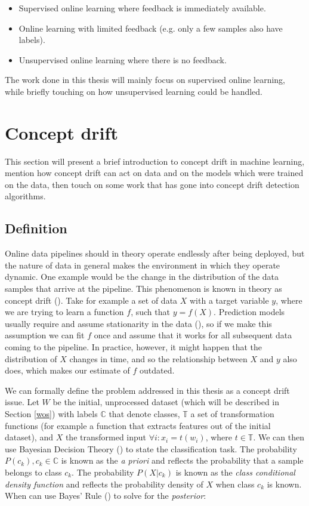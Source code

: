 \documentclass[12pt]{extreport}
\begin{document}
\begin{itemize}
    \item Supervised online learning where feedback is immediately available.
    \item Online learning with limited feedback (e.g. only a few samples also have labels).
    \item Unsupervised online learning where there is no feedback.
\end{itemize}

The work done in this thesis will mainly focus on supervised online learning, while briefly touching on how unsupervised learning could be handled.

\section{Concept drift} \label{concept-drift}

This section will present a brief introduction to concept drift in machine learning, mention how concept drift can act on data and on the models which were trained on the data, then touch on some work that has gone into concept drift detection algorithms.

\subsection{Definition}

Online data pipelines should in theory operate endlessly after being deployed, but the nature of data in general makes the environment in which they operate dynamic. One example would be the change in the distribution of the data samples that arrive at the pipeline. This phenomenon is known in theory as concept drift (\cite{survey-concept-drift}). Take for example a set of data $X$ with a target variable $y$, where we are trying to learn a function $f$, such that $y = f(X)$. Prediction models usually require and assume stationarity in the data (\cite{Heng_Wang_2015}), so if we make this assumption we can fit $f$ once and assume that it works for all subsequent data coming to the pipeline. In practice, however, it might happen that the distribution of $X$ changes in time, and so the relationship between $X$ and $y$ also does, which makes our estimate of $f$ outdated.

We can formally define the problem addressed in this thesis as a concept drift issue. Let $W$ be the initial, unprocessed dataset (which will be described in Section \ref{wos}) with labels $\mathbb{C}$ that denote classes, $\mathbb{T}$ a set of transformation functions (for example a function that extracts features out of the initial dataset), and $X$ the transformed input $\forall i: x_i = t(w_i)$, where $t \in \mathbb{T}$. We can then use Bayesian Decision Theory (\cite{pattern-classification}) to state the classification task. The probability $P(c_k), c_k \in \mathbb{C}$ is known as the \emph{a priori} and reflects the probability that a sample belongs to class $c_k$. The probability $P(X|c_k)$ is known as the \emph{class conditional density function} and reflects the probability density of $X$ when class $c_k$ is known. When can use Bayes' Rule (\cite{bayesrule}) to solve for the \emph{posterior}:
\end{document}
